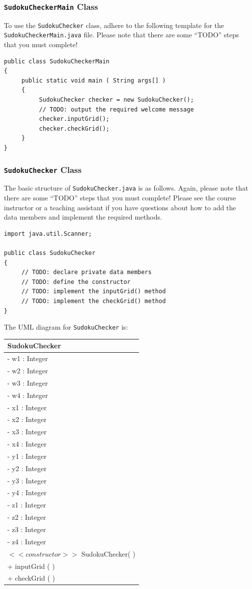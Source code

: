 \subsubsection*{{\tt SudokuCheckerMain} Class}

To use the {\tt SudokuChecker} class, adhere to the following template for the {\tt SudokuCheckerMain.java} file. Please
note that there are some ``TODO'' steps that you must complete!

\begin{verbatim}
public class SudokuCheckerMain
{
     public static void main ( String args[] )
     {
          SudokuChecker checker = new SudokuChecker();
          // TODO: output the required welcome message
          checker.inputGrid();
          checker.checkGrid();
     }
}
\end{verbatim}

\subsubsection*{{\tt SudokuChecker} Class}

\noindent The basic structure of {\tt SudokuChecker.java} is as follows. Again, please note that there are some ``TODO''
steps that you must complete! Please see the course instructor or a teaching assistant if you have questions about how
to add the data members and implement the required methods.

\begin{verbatim}
import java.util.Scanner;

public class SudokuChecker
{
     // TODO: declare private data members
     // TODO: define the constructor
     // TODO: implement the inputGrid() method
     // TODO: implement the checkGrid() method
}
\end{verbatim}
The UML diagram for {\tt SudokuChecker} is:
\begin{tabular}{|l|}
\hline
\textbf{SudokuChecker} \\
\hline
- w1 : Integer\\
- w2 : Integer\\
- w3 : Integer\\
- w4 : Integer\\
- x1 : Integer\\
- x2 : Integer\\
- x3 : Integer\\
- x4 : Integer\\
- y1 : Integer\\
- y2 : Integer\\
- y3 : Integer\\
- y4 : Integer\\
- z1 : Integer\\
- z2 : Integer\\
- z3 : Integer\\
- z4 : Integer\\
\hline
$<<constructor>>$ SudokuChecker( )\\
\hline
+ inputGrid ( )\\
+ checkGrid ( )\\
\hline
\end{tabular}

